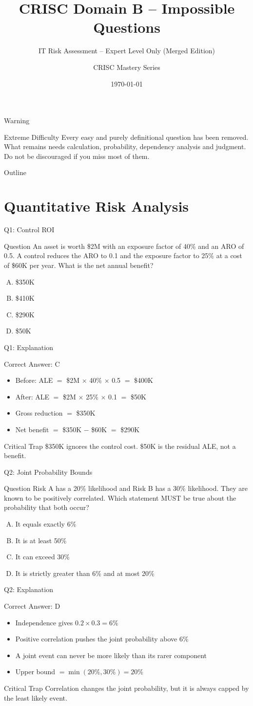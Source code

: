 \documentclass[aspectratio=169]{beamer}
\title{CRISC Domain B -- Impossible Questions}
\subtitle{IT Risk Assessment -- Expert Level Only (Merged Edition)}
\author{CRISC Mastery Series}
\date{\today}
\newcommand{\hq}[7]{%
	\begin{frame}{Q#1: #2}
		\begin{block}{Question}
			#3
		\end{block}
		\begin{enumerate}[(A)]
			#4
		\end{enumerate}
	\end{frame}
	\begin{frame}{Q#1: Explanation}
		\begin{block}{Correct Answer: #5}
			\begin{itemize}
				#6
			\end{itemize}
		\end{block}
		\begin{alertblock}{Critical Trap}
			#7
		\end{alertblock}
	\end{frame}
}
\begin{document}
	
	\begin{frame}
		\titlepage
	\end{frame}
	
	\begin{frame}{Warning}
		\begin{alertblock}{Extreme Difficulty}
			Every easy and purely definitional question has been removed.\\
			What remains needs calculation, probability, dependency analysis and judgment.\\
			Do not be discouraged if you miss most of them.
		\end{alertblock}
	\end{frame}
	
	\begin{frame}{Outline}
		\tableofcontents
	\end{frame}
	
	\section{Quantitative Risk Analysis}
	
	\hq{1}{Control ROI}
	{An asset is worth \$2M with an exposure factor of 40\% and an ARO of 0.5. A control reduces the ARO to 0.1 and the exposure factor to 25\% at a cost of \$60K per year. What is the net annual benefit?}
	{\item \$350K
		\item \$410K
		\item \$290K
		\item \$50K}
	{C}
	{\item Before: ALE $=$ \$2M $\times$ 40\% $\times$ 0.5 $=$ \$400K
		\item After: ALE $=$ \$2M $\times$ 25\% $\times$ 0.1 $=$ \$50K
		\item Gross reduction $=$ \$350K
		\item Net benefit $=$ \$350K $-$ \$60K $=$ \$290K}
	{\$350K ignores the control cost. \$50K is the residual ALE, not a benefit.}
	
	\hq{2}{Joint Probability Bounds}
	{Risk A has a 20\% likelihood and Risk B has a 30\% likelihood. They are known to be positively correlated. Which statement MUST be true about the probability that both occur?}
	{\item It equals exactly 6\%
		\item It is at least 50\%
		\item It can exceed 30\%
		\item It is strictly greater than 6\% and at most 20\%}
	{D}
	{\item Independence gives $0.2 \times 0.3 = 6\%$
		\item Positive correlation pushes the joint probability above 6\%
		\item A joint event can never be more likely than its rarer component
		\item Upper bound $= \min(20\%, 30\%) = 20\%$}
	{Correlation changes the joint probability, but it is always capped by the least likely event.}
	
\end{document}
